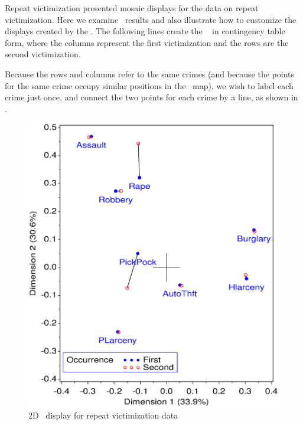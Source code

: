 \begin{Example}[victims2]{Repeat victimization}
 presented mosaic displays for the data on repeat
victimization.
Here we examine \CA\ results and also illustrate how to customize the
displays created by the .
The following lines create the \Dset\  in contingency table
form, where the columns represent the first victimization and the
rows are the second victimization.
Because the rows and columns refer to the same crimes
(and because the points for the same crime occupy similar positions
in the \CA\ map), we wish to label each crime just once, and
connect the two points for each crime by a line, as shown in .
\begin{figure}[htb]
  \centering
  \includegraphics[scale=.6,clip]{ch5/fig/corresp5a.eps}
  \caption{2D \CA\ display for repeat victimization data}%
  \label{fig:corresp5a}
\end{figure}


\end{Example}
